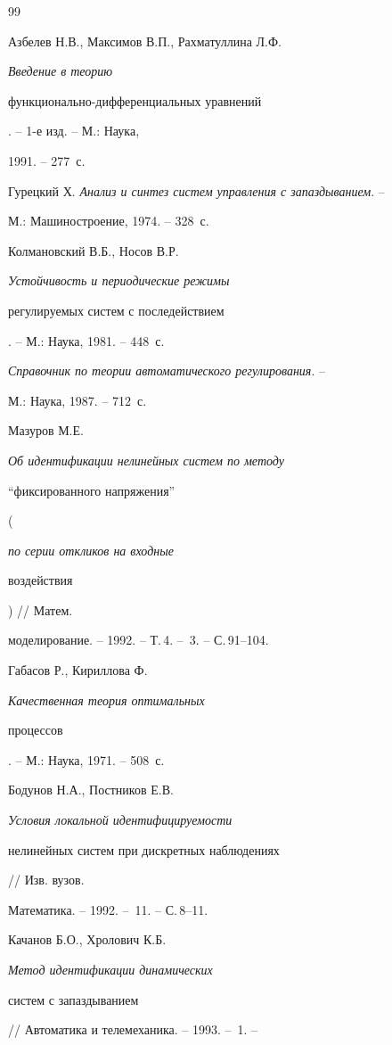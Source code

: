 \begin{thebibliography}{99} 


 




Азбелев Н.В., Максимов В.П., Рахматуллина Л.Ф. {\em Введение в теорию 


функционально-дифференциальных уравнений}. -- 1-е изд. -- М.: Наука, 


1991. -- 277~с. 




Гурецкий Х. {\em Анализ и синтез систем управления с запаздыванием}. -- 


М.: Машиностроение, 1974. -- 328~с. 




Колмановский В.Б., Носов В.Р. {\em Устойчивость и периодические режимы 


регулируемых систем с последействием}. -- М.: Наука, 1981. -- 448~с. 




{\em Справочник по теории автоматического регулирования}. -- 


М.: Наука, 1987. -- 712~с. 




Мазуров М.Е. {\em Об идентификации нелинейных систем по методу 


``фиксированного напряжения''} ({\em по серии откликов на входные 


воздействия}) // Матем. 


моделирование. -- 1992. -- Т.\,4. -- \No\,3. -- С.\,91--104. 




Габасов Р., Кириллова Ф. {\em Качественная теория оптимальных 


процессов}. -- М.: Наука, 1971. -- 508~с. 




Бодунов Н.А., Постников Е.В. {\em Условия локальной идентифицируемости 


нелинейных систем при дискретных наблюдениях} // Изв. вузов. 


Математика. -- 1992. -- \No\,11. -- С.\,8--11. 




Качанов Б.О., Хролович К.Б. {\em Метод идентификации динамических 


систем с запаздыванием} // Автоматика и телемеханика. -- 1993. -- \No\,1. -- 



\end{thebibliography}
